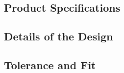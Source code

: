 


\subsection{Product Specifications}

\subsection{Details of the Design}

\subsection{Tolerance and Fit}
